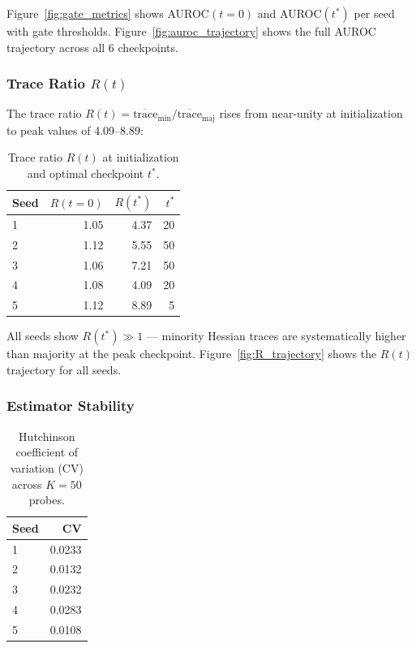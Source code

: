 Figure~\ref{fig:gate_metrics} shows AUROC$(t{=}0)$ and AUROC$(t^*)$ per seed with gate thresholds. Figure~\ref{fig:auroc_trajectory} shows the full AUROC trajectory across all 6 checkpoints.

\subsubsection*{Trace Ratio $R(t)$}

The trace ratio $R(t) = \overline{\text{trace}}_{\text{min}} / \overline{\text{trace}}_{\text{maj}}$ rises from near-unity at initialization to peak values of 4.09--8.89:

\begin{table}[h]
\centering
\caption{Trace ratio $R(t)$ at initialization and optimal checkpoint $t^*$.}
\label{tab:ratio}
\begin{tabular}{@{}lrrr@{}}
\toprule
Seed & $R(t{=}0)$ & $R(t^*)$ & $t^*$ \\
\midrule
1 & 1.05 & 4.37 & 20 \\
2 & 1.12 & 5.55 & 50 \\
3 & 1.06 & 7.21 & 50 \\
4 & 1.08 & 4.09 & 20 \\
5 & 1.12 & 8.89 & 5  \\
\bottomrule
\end{tabular}
\end{table}

All seeds show $R(t^*)\gg 1$ --- minority Hessian traces are systematically higher than majority at the peak checkpoint. Figure~\ref{fig:R_trajectory} shows the $R(t)$ trajectory for all seeds.

\subsubsection*{Estimator Stability}

\begin{table}[h]
\centering
\caption{Hutchinson coefficient of variation (CV) across $K{=}50$ probes.}
\label{tab:cv}
\begin{tabular}{@{}lr@{}}
\toprule
Seed & CV \\
\midrule
1 & 0.0233 \\
2 & 0.0132 \\
3 & 0.0232 \\
4 & 0.0283 \\
5 & 0.0108 \\
\bottomrule
\end{tabular}
\end{table}

